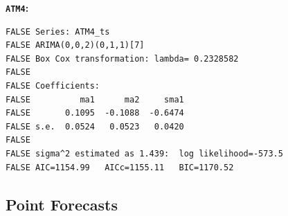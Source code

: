\documentclass[openany]{book}
\begin{document}
\textbf{\texttt{ATM4}:}

\begin{verbatim}
FALSE Series: ATM4_ts 
FALSE ARIMA(0,0,2)(0,1,1)[7] 
FALSE Box Cox transformation: lambda= 0.2328582 
FALSE 
FALSE Coefficients:
FALSE          ma1      ma2     sma1
FALSE       0.1095  -0.1088  -0.6474
FALSE s.e.  0.0524   0.0523   0.0420
FALSE 
FALSE sigma^2 estimated as 1.439:  log likelihood=-573.5
FALSE AIC=1154.99   AICc=1155.11   BIC=1170.52
\end{verbatim}

\hypertarget{Part-A-FC}{%
\subsection*{Point Forecasts}\label{Part-A-FC}}
\end{document}
